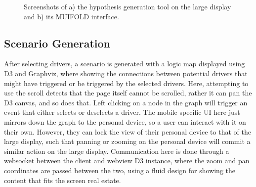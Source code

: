 \begin{figure}
\centering
    \hfill
    \hfill
    \hfill
  \caption{Screenshots of a) the hypothesis generation tool on the large display and b) its MUIFOLD interface.}
  \label{fig:prediction_ui}
\end{figure}


\subsection{Scenario Generation}

After selecting drivers, a scenario is generated with a logic
map displayed using D3 and Graphviz, where showing the connections
between potential drivers that might have triggered or be triggered
by the selected drivers. Here, attempting to use the scroll detects
that the page itself cannot be scrolled, rather it can pan the D3
canvas, and so does that. Left clicking on a node in the graph
will trigger an event that either selects or deselects a driver. The
mobile specific UI here just mirrors down the graph to the personal
device, so a user can interact with it on their own. However, they can
lock the view of their personal device to that of the large display,
such that panning or zooming on the personal device will commit a
similar action on the large display. Communication here is done
through a websocket between the client and webview D3 instance,
where the zoom and pan coordinates are passed between the two, using
a fluid design for showing the content that fits the screen
real estate.